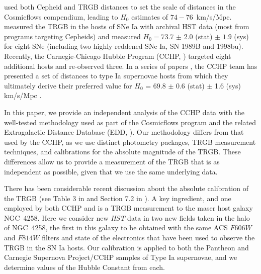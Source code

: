 \documentclass[twocolumn]{aastex62}
\begin{document}
\citet{2013AJ....146...86T, 2016AJ....152...50T} used both Cepheid and TRGB distances to set the scale of distances in the Cosmicflows compendium, leading to $H_0$ estimates of $74-76$~km/s/Mpc. \cite{2017ApJ...836...74J} measured the TRGB in the hosts of SNe Ia with archival HST data (most from programs targeting Cepheids) and measured $H_0=73.7$ $\pm$ $2.0$ (stat) $\pm$ $1.9$ (sys) for eight SNe (including two highly reddened SNe Ia, SN 1989B and 1998bu).  Recently, the Carnegie-Chicago Hubble Program (CCHP, \citealt{2016ApJ...832..210B,2019ApJ...882...34F}) targeted eight additional hosts and re-observed three. In a series of papers \citep{2018ApJ...852...60J, 2018ApJ...861..104H, 2018ApJ...866..145H, 2019ApJ...882..150H, 2019ApJ...885..141B,2021arXiv210112232H}, the CCHP team has presented a set of distances to type Ia supernovae hosts from which they ultimately derive their preferred value for $H_{0}$ = 69.8 $\pm$ 0.6 (stat) $\pm$ 1.6 (sys) km/s/Mpc \citep{2021arXiv210615656F}. 

In this paper, we provide an independent analysis of the CCHP data with the well-tested methodology used as part of the Cosmicflows program \citep{2008ApJ...676..184T, 2013AJ....146...86T, 2016AJ....152...50T} and the related Extragalactic Distance Database (EDD, \citealt{2009AJ....138..323T, 2009AJ....138..332J, 2021arXiv210402649A}). Our methodology differs from that used by the CCHP, as we use distinct photometry packages, TRGB measurement techniques, and calibrations for the absolute magnitude of the TRGB. These differences allow us to provide a measurement of the TRGB that is as independent as possible, given that we use the same underlying data.

There has been considerable recent discussion about the absolute calibration of the TRGB (see Table 3 in \citealt{2021ApJ...911...65B} and Section 7.2 in \citealt{2021arXiv210402649A}).  A key ingredient, and one employed by both CCHP and \cite{2017ApJ...836...74J} is a TRGB measurement to the maser host galaxy NGC~4258. Here we consider new \textit{HST} data in two new fields taken in the halo of NGC~4258, the first in this galaxy to be obtained with the same ACS $F606W$ and $F814W$ filters and state of the electronics that have been used to observe the TRGB in the SN Ia hosts. Our calibration is applied to both the Pantheon \citep{2018ApJ...859..101S} and Carnegie Supernova Project/CCHP \citep{2006PASP..118....2H,2017AJ....154..211K} samples of Type Ia supernovae, and we determine values of the Hubble Constant from each.
\end{document}
